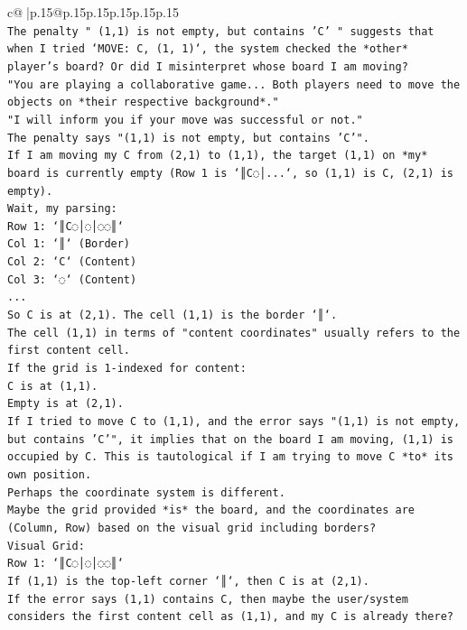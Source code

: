 \documentclass{article}
\begin{document}
{\begin{supertabular}{c@{$\;$}|p{.15\linewidth}@{}p{.15\linewidth}p{.15\linewidth}p{.15\linewidth}p{.15\linewidth}p{.15\linewidth}}
{{{\\ 
\texttt{The penalty " (1,1) is not empty, but contains 'C' " suggests that when I tried `MOVE: C, (1, 1)`, the system checked the *other* player's board? Or did I misinterpret whose board I am moving?} \\
\texttt{"You are playing a collaborative game... Both players need to move the objects on *their respective background*."} \\
\texttt{"I will inform you if your move was successful or not."} \\
\texttt{The penalty says "(1,1) is not empty, but contains 'C'".} \\
\texttt{If I am moving my C from (2,1) to (1,1), the target (1,1) on *my* board is currently empty (Row 1 is `║C◌│...`, so (1,1) is C, (2,1) is empty).} \\
\texttt{Wait, my parsing:} \\
\texttt{Row 1: `║C◌│◌│◌◌║`} \\
\texttt{Col 1: `║` (Border)} \\
\texttt{Col 2: `C` (Content)} \\
\texttt{Col 3: `◌` (Content)} \\
\texttt{...} \\
\texttt{So C is at (2,1). The cell (1,1) is the border `║`.} \\
\texttt{The cell (1,1) in terms of "content coordinates" usually refers to the first content cell.} \\
\texttt{If the grid is 1{-}indexed for content:} \\
\texttt{C is at (1,1).} \\
\texttt{Empty is at (2,1).} \\
\texttt{If I tried to move C to (1,1), and the error says "(1,1) is not empty, but contains 'C'", it implies that on the board I am moving, (1,1) is occupied by C. This is tautological if I am trying to move C *to* its own position.} \\
\texttt{Perhaps the coordinate system is different.} \\
\texttt{Maybe the grid provided *is* the board, and the coordinates are (Column, Row) based on the visual grid including borders?} \\
\texttt{Visual Grid:} \\
\texttt{Row 1: `║C◌│◌│◌◌║`} \\
\texttt{If (1,1) is the top{-}left corner `║`, then C is at (2,1).} \\
\texttt{If the error says (1,1) contains C, then maybe the user/system considers the first content cell as (1,1), and my C is already there?} \\
}}}
\end{supertabular}}
\end{document}
